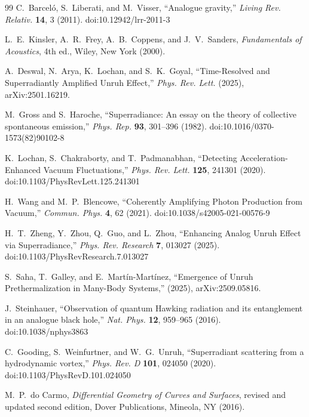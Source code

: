 \documentclass[10pt,reprint,aps,onecolumn,nofootinbib]{revtex4-2}
\begin{document}
\begin{thebibliography}{99}
    C.~Barcel\'o, S.~Liberati, and M.~Visser,
    ``Analogue gravity,''
    \textit{Living Rev. Relativ.} \textbf{14}, 3 (2011).
    doi:10.12942/lrr-2011-3

    L.~E.~Kinsler, A.~R.~Frey, A.~B.~Coppens, and J.~V.~Sanders,
    \textit{Fundamentals of Acoustics}, 4th ed.,
    Wiley, New York (2000).

    A.~Deswal, N.~Arya, K.~Lochan, and S.~K.~Goyal,
    ``Time-Resolved and Superradiantly Amplified Unruh Effect,''
    \textit{Phys. Rev. Lett.} (2025), arXiv:2501.16219.

    M.~Gross and S.~Haroche,
    ``Superradiance: An essay on the theory of collective spontaneous emission,''
    \textit{Phys. Rep.} \textbf{93}, 301--396 (1982).
    doi:10.1016/0370-1573(82)90102-8

    K.~Lochan, S.~Chakraborty, and T.~Padmanabhan,
    ``Detecting Acceleration-Enhanced Vacuum Fluctuations,''
    \textit{Phys. Rev. Lett.} \textbf{125}, 241301 (2020).
    doi:10.1103/PhysRevLett.125.241301

    H.~Wang and M.~P.~Blencowe,
    ``Coherently Amplifying Photon Production from Vacuum,''
    \textit{Commun. Phys.} \textbf{4}, 62 (2021).
    doi:10.1038/s42005-021-00576-9



    H.~T.~Zheng, Y.~Zhou, Q.~Guo, and L.~Zhou,
    ``Enhancing Analog Unruh Effect via Superradiance,''
    \textit{Phys. Rev. Research} \textbf{7}, 013027 (2025).
    doi:10.1103/PhysRevResearch.7.013027

    S.~Saha, T.~Galley, and E.~Mart\'in-Mart\'inez,
    ``Emergence of Unruh Prethermalization in Many-Body Systems,''
    (2025), arXiv:2509.05816.

    J.~Steinhauer,
    ``Observation of quantum Hawking radiation and its entanglement in an analogue black hole,''
    \textit{Nat. Phys.} \textbf{12}, 959--965 (2016).
    doi:10.1038/nphys3863

    C.~Gooding, S.~Weinfurtner, and W.~G.~Unruh,
    ``Superradiant scattering from a hydrodynamic vortex,''
    \textit{Phys. Rev. D} \textbf{101}, 024050 (2020).
    doi:10.1103/PhysRevD.101.024050

    M.~P.~do Carmo,
    \textit{Differential Geometry of Curves and Surfaces},
    revised and updated second edition,
    Dover Publications, Mineola, NY (2016).


\end{thebibliography}
\end{document}
